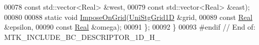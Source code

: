 \begin{DoxyCode}
00078                                       \textcolor{keyword}{const} std::vector<Real> &west,
00079                                       \textcolor{keyword}{const} std::vector<Real> &east);
00080 
00088   \textcolor{keyword}{static} \textcolor{keywordtype}{void} \hyperlink{classmtk_1_1BCDescriptor1D_adfb101c1a12b452f83dacd207febea0a}{ImposeOnGrid}(\hyperlink{classmtk_1_1UniStgGrid1D}{UniStgGrid1D} &grid,
00089                            \textcolor{keyword}{const} \hyperlink{group__c01-roots_gac080bbbf5cbb5502c9f00405f894857d}{Real} &epsilon,
00090                            \textcolor{keyword}{const} \hyperlink{group__c01-roots_gac080bbbf5cbb5502c9f00405f894857d}{Real} &omega);
00091 \};
00092 \}
00093 \textcolor{preprocessor}{#endif  // End of: MTK\_INCLUDE\_BC\_DESCRIPTOR\_1D\_H\_}
\end{DoxyCode}
